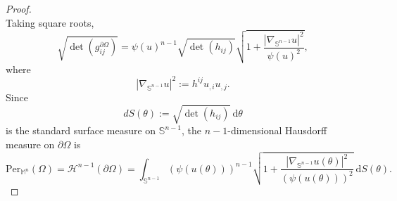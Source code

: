 \documentclass[10pt,a4paper]{amsart}
\newcommand{\m}{\mathbb{M}^n}
\newcommand{\sn}{\mathbb{S}^{n-1}}
\begin{document}
\begin{proof}
\begin{equation*}
\end{equation*}
Taking square roots,
\begin{equation*}
    \sqrt{\det(g_{ij}^{\partial \Omega})}= \psi(u)^{n-1}\sqrt{\det(h_{ij})}\sqrt{1+\frac{|\nabla_{\sn}u|^2}{\psi(u)^2}},
\end{equation*}
where
\begin{equation*}
    |\nabla_{\sn}u|^2:= h^{ij}u_{,i}u_{,j}.
\end{equation*}
Since 
\begin{equation*}
    dS(\theta):=\sqrt{\det(h_{ij})}\ \mathrm{d}\theta
\end{equation*}
is the standard surface measure on $\sn$, the $n-1$-dimensional Hausdorff measure on $\partial \Omega$ is
\begin{equation*}
    \text{Per}_{\m}(\Omega)=\mathcal{H}^{n-1}(\partial \Omega)= \int_{\sn}(\psi(u(\theta)))^{n-1}\sqrt{1+\frac{|\nabla_{\sn}u(\theta)|^2}{(\psi(u(\theta)))^2}}\ \mathrm{d}S(\theta).
\end{equation*}
\end{proof}
\end{document}
